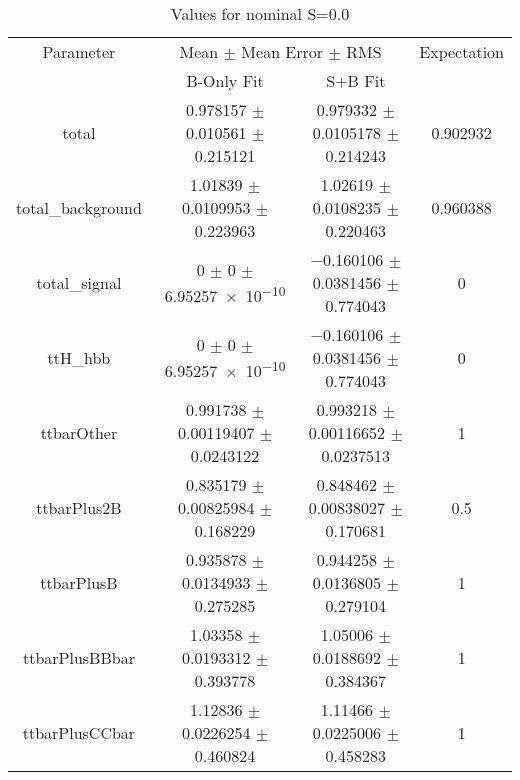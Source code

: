 \begin{table}
\centering
\caption{Values for nominal S=0.0}
\begin{tabular}{cccc}
\toprule
Parameter & \multicolumn{2}{c}{Mean $\pm$ Mean Error $\pm$ RMS} & Expectation\\
 & B-Only Fit & S+B Fit & \\
\midrule
total & \num{0.978157} $\pm$ \num{0.010561} $\pm$ \num{0.215121} & \num{0.979332} $\pm$ \num{0.0105178} $\pm$ \num{0.214243} & \num{0.902932}\\
total\_background & \num{1.01839} $\pm$ \num{0.0109953} $\pm$ \num{0.223963} & \num{1.02619} $\pm$ \num{0.0108235} $\pm$ \num{0.220463} & \num{0.960388}\\
total\_signal & \num{0} $\pm$ \num{0} $\pm$ \num{6.95257e-10} & \num{-0.160106} $\pm$ \num{0.0381456} $\pm$ \num{0.774043} & \num{0}\\
ttH\_hbb & \num{0} $\pm$ \num{0} $\pm$ \num{6.95257e-10} & \num{-0.160106} $\pm$ \num{0.0381456} $\pm$ \num{0.774043} & \num{0}\\
ttbarOther & \num{0.991738} $\pm$ \num{0.00119407} $\pm$ \num{0.0243122} & \num{0.993218} $\pm$ \num{0.00116652} $\pm$ \num{0.0237513} & \num{1}\\
ttbarPlus2B & \num{0.835179} $\pm$ \num{0.00825984} $\pm$ \num{0.168229} & \num{0.848462} $\pm$ \num{0.00838027} $\pm$ \num{0.170681} & \num{0.5}\\
ttbarPlusB & \num{0.935878} $\pm$ \num{0.0134933} $\pm$ \num{0.275285} & \num{0.944258} $\pm$ \num{0.0136805} $\pm$ \num{0.279104} & \num{1}\\
ttbarPlusBBbar & \num{1.03358} $\pm$ \num{0.0193312} $\pm$ \num{0.393778} & \num{1.05006} $\pm$ \num{0.0188692} $\pm$ \num{0.384367} & \num{1}\\
ttbarPlusCCbar & \num{1.12836} $\pm$ \num{0.0226254} $\pm$ \num{0.460824} & \num{1.11466} $\pm$ \num{0.0225006} $\pm$ \num{0.458283} & \num{1}\\
\bottomrule
\end{tabular}
\end{table}